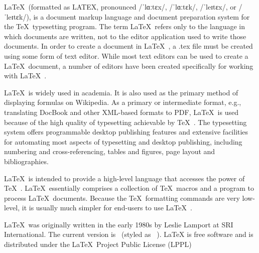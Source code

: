
\LaTeX\ (formatted as LATEX, pronounced /ˈlɑːtɛx/, /ˈlɑːtɛk/, /ˈleɪtɛx/, or /ˈleɪtɛk/), is a document markup language and document preparation system for the \TeX\ typesetting program. The term \LaTeX\ refers only to the language in which documents are written, not to the editor application used to write those documents. In order to create a document in \LaTeX\ , a .tex file must be created using some form of text editor. While most text editors can be used to create a \LaTeX\ document, a number of editors have been created specifically for working with \LaTeX\ .

\LaTeX\ is widely used in academia.\cite{WrTex,Alexia} It is also used as the primary method of displaying formulas on Wikipedia. As a primary or intermediate format, e.g., translating DocBook and other XML-based formats to PDF, \LaTeX\ is used because of the high quality of typesetting achievable by \TeX\ . The typesetting system offers programmable desktop publishing features and extensive facilities for automating most aspects of typesetting and desktop publishing, including numbering and cross-referencing, tables and figures, page layout and bibliographies.

\LaTeX\ is intended to provide a high-level language that accesses the power of \TeX\ . \LaTeX\ essentially comprises a collection of \TeX\ macros and a program to process \LaTeX\ documents. Because the \TeX\ formatting commands are very low-level, it is usually much simpler for end-users to use \LaTeX\ .

\LaTeX\ was originally written in the early 1980s by Leslie Lamport at SRI International.\cite{Leslie} The current version is \LaTeXe\ (styled as \LaTeXe\ ). LaTeX is free software and is distributed under the \LaTeX\ Project Public License (LPPL)

\newcommand{\keywords}{\LaTeX}
